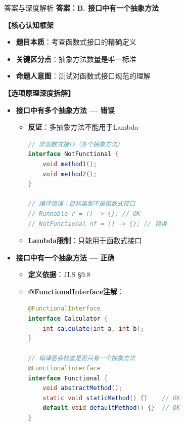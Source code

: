 \documentclass[12pt, a4paper]{ctexart}
\begin{document}
\begin{enumerate}[label=\textbf{\arabic*.}]
	      \begin{bluebox}{答案与深度解析}
		      \textbf{答案：B. 接口中有一个抽象方法}

		      \textbf{【核心认知框架}
		      \begin{itemize}[label={}, leftmargin=*, nosep]
			      \item \textbf{题目本质}：考查函数式接口的精确定义
			      \item \textbf{关键区分点}：抽象方法数量是唯一标准
			      \item \textbf{命题人意图}：测试对函数式接口规范的理解
		      \end{itemize}

		      \textbf{【选项原理深度拆解】}

		      \begin{itemize}[leftmargin=*, nosep, label={}]
			      \item[A] \textbf{接口中有多个抽象方法 — 错误}
			            \begin{itemize}[label={}, leftmargin=*, nosep]
				            \item \textbf{反证}：多抽象方法不能用于Lambda
				                  \begin{lstlisting}[language=Java]
// 非函数式接口（多个抽象方法）
interface NotFunctional {
    void method1();
    void method2();
}

// 编译错误：目标类型不是函数式接口
// Runnable r = () -> {}; // OK
// NotFunctional nf = () -> {}; // 错误
				      \end{lstlisting}
				            \item \textbf{Lambda限制}：只能用于函数式接口
			            \end{itemize}

			      \item[B] \textbf{接口中有一个抽象方法 — 正确}
			            \begin{itemize}[label={}, leftmargin=*, nosep]
				            \item \textbf{定义依据}：JLS §9.8
				            \item \textbf{@FunctionalInterface注解}：
				                  \begin{lstlisting}[language=Java]
@FunctionalInterface
interface Calculator {
    int calculate(int a, int b);
}

// 编译器会检查是否只有一个抽象方法
@FunctionalInterface
interface Functional {
    void abstractMethod();
    static void staticMethod() {}    // OK
    default void defaultMethod() {}  // OK
}


\end{lstlisting}
\end{itemize}
\end{itemize}
\end{bluebox}
\end{enumerate}
\end{document}

